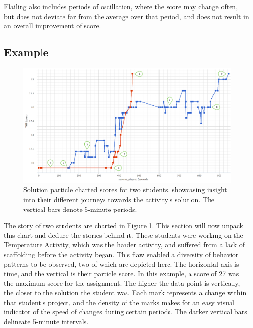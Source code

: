 Flailing also includes periods of oscillation, where the score may change often, but does not deviate far from the average over that period, and does not result in an overall improvement of score. 


\subsection{Example}

\begin{figure}
  \centering
      \includegraphics[width=\textwidth]{images/particles-graph-annotated}
  \caption[Solution particle charted scores for two students]{Solution particle charted scores for two students, showcasing insight into their different journeys towards the activity's solution. The vertical bars denote 5-minute periods.}
  \label{fig:paricles-temperature-two}
\end{figure}

The story of two students are charted in Figure \ref{fig:paricles-temperature-two}. This section will now unpack this chart and deduce the stories behind it. These students were working on the Temperature Activity, which was the harder activity, and suffered from a lack of scaffolding before the activity began. This flaw enabled a diversity of behavior patterns to be observed, two of which are depicted here. The horizontal axis is time, and the vertical is their particle score. In this example, a score of 27 was the maximum score for the assignment. The higher the data point is vertically, the closer to the solution the student was. Each mark represents a change within that student's project, and the density of the marks makes for an easy visual indicator of the speed of changes during certain periods. The darker vertical bars delineate 5-minute intervals.


